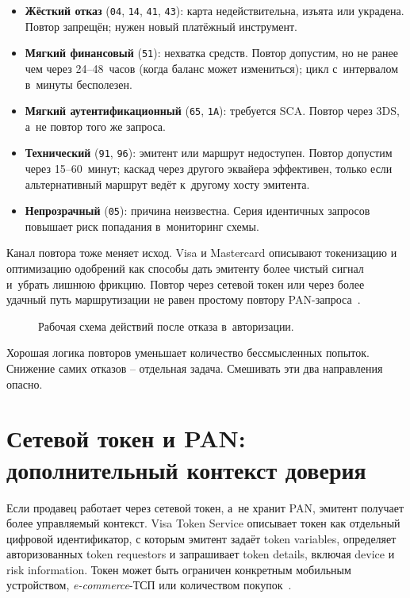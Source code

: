 \begin{itemize}
  \item \textbf{Жёсткий отказ} (\texttt{04}, \texttt{14},
    \texttt{41}, \texttt{43}): карта недействительна, изъята
    или украдена. Повтор запрещён; нужен новый платёжный
    инструмент.
  \item \textbf{Мягкий финансовый} (\texttt{51}): нехватка
    средств. Повтор допустим, но не ранее чем через 24--48~часов
    (когда баланс может измениться); цикл с~интервалом в~минуты
    бесполезен.
  \item \textbf{Мягкий аутентификационный} (\texttt{65},
    \texttt{1A}): требуется SCA. Повтор через 3DS, а~не повтор
    того же запроса.
  \item \textbf{Технический} (\texttt{91}, \texttt{96}):
    эмитент или маршрут недоступен. Повтор допустим через
    15--60~минут; каскад через другого эквайера эффективен,
    только если альтернативный маршрут ведёт к~другому хосту
    эмитента.
  \item \textbf{Непрозрачный} (\texttt{05}): причина неизвестна.
    Серия идентичных запросов повышает риск попадания
    в~мониторинг схемы.
\end{itemize}

Канал повтора тоже меняет исход. Visa и Mastercard описывают
токенизацию и оптимизацию одобрений как способы дать эмитенту более
чистый сигнал и~убрать лишнюю фрикцию. Повтор через
сетевой токен или через более удачный путь маршрутизации
не равен простому повтору
PAN-запроса~\cite{visa-vts,visa-tokenization-security,mc-acquirers-psps,mc-pop}.

\begin{figure}[tbp]
  \centering
  \caption{Рабочая схема действий после отказа в~авторизации.}\label{fig:decline-retry-tree}
\end{figure}

Хорошая логика повторов уменьшает количество бессмысленных попыток.
Снижение самих отказов -- отдельная задача. Смешивать эти два
направления опасно.

\section{Сетевой токен и PAN: дополнительный контекст доверия}\label{sec:decline-tokens}

Если продавец работает через сетевой токен, а~не хранит PAN,
эмитент получает более управляемый контекст. Visa Token Service
описывает токен как отдельный цифровой идентификатор, с
которым эмитент задаёт token variables, определяет авторизованных
token requestors и запрашивает token details, включая device и risk
information. Токен может быть
ограничен конкретным мобильным устройством, \textit{e-commerce}-ТСП или
количеством покупок~\cite{visa-vts,emvco-payment-tokenisation-guide}.


